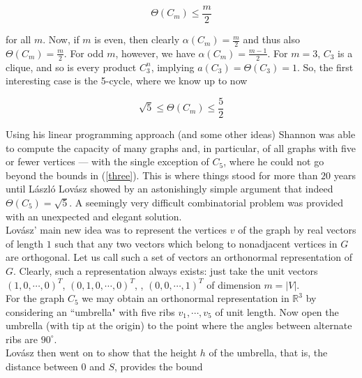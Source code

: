 \begin{equation*}
  \Theta(C_m) \leq \frac{m}{2}
\end{equation*}

for all $m$. Now, if $m$ is even, then clearly $\alpha(C_m) = \frac{m}{2}$
and thus also $\Theta(C_m) = \frac{m}{2}$. For odd $m$, however, we have $\alpha(C_m) = \frac{m-1}{2}$. 
For $m = 3$, $C_3$ is a clique, and so is every product $C_3^n$, implying $a(C_3) = \Theta(C_3) = 1$. 
So, the first interesting case is the 5-cycle, where we know up to now 

\begin{equation}
  \sqrt{5} \leq \Theta(C_m) \leq \frac{5}{2} \label{three}
\end{equation}

Using his linear programming approach (and some other ideas) Shannon 
was able to compute the capacity of many graphs and, in particular, of all 
graphs with five or fewer vertices --- with the single exception of $C_5$, where 
he could not go beyond the bounds in (\ref{three}). This is where things stood for 
more than $20$ years until L\'aszl\'o Lov\'asz showed by an astonishingly simple argument
that indeed $\Theta(C_5) = \sqrt{5}$. A seemingly very difficult combinatorial 
problem was provided with an unexpected and elegant solution.\\

Lov\'asz' main new idea was to represent the vertices $v$ of the graph by 
real vectors of length $1$ such that any two vectors which belong to nonadjacent 
vertices in $G$ are orthogonal. Let us call such a set of vectors 
an orthonormal representation of $G$. Clearly, such a representation always 
exists: just take the unit vectors $(1,0,\dotsb,0)^T$, $(0,1,0,\dotsb,0)^T$, \dotsb,
$(0,0,\dotsb,1)^T$ of dimension $m=|V|$.\\


For the graph $C_5$ we may obtain an orthonormal representation in $\mathbb{R}^3$ by 
considering an ``umbrella" with five ribs $v_1, \dotsb , v_5$ of unit length. Now 
open the umbrella (with tip at the origin) to the point where the angles 
between alternate ribs are $90^\circ$. \\
Lov\'asz then went on to show that the height $h$ of the umbrella, that is, the 
distance between $0$ and $S$, provides the bound

